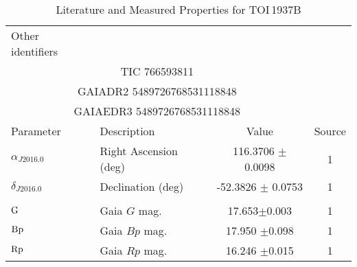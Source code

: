 \begin{table*}
\scriptsize
\setlength{\tabcolsep}{2pt}
\centering
\caption{Literature and Measured Properties for TOI$\,$1937B}
\label{tab:compparams}
\begin{tabular}{llcc}
  \hline
  \hline
Other identifiers\dotfill & \\
\multicolumn{3}{c}{TIC 766593811} \\
\multicolumn{3}{c}{GAIADR2 5489726768531118848} \\
\multicolumn{3}{c}{GAIAEDR3 5489726768531118848} \\
\hline
\hline
Parameter & Description & Value & Source\\
\hline 
$\alpha_{J2016.0}$\dotfill	&Right Ascension (deg)\dotfill & 116.3706 $\pm$ 0.0098& 1	\\
$\delta_{J2016.0}$\dotfill	&Declination (deg)\dotfill & -52.3826 $\pm$ 0.0753  & 1	\\
\\
${\rm G}$\dotfill     & Gaia $G$ mag.\dotfill     & 17.653$\pm$0.003 & 1\\
${\rm Bp}$\dotfill     & Gaia $Bp$ mag.\dotfill     & 17.950 $\pm$0.098 & 1\\
${\rm Rp}$\dotfill     & Gaia $Rp$ mag.\dotfill     & 16.246 $\pm$0.015 & 1\\

\end{tabular}
\end{table*}
